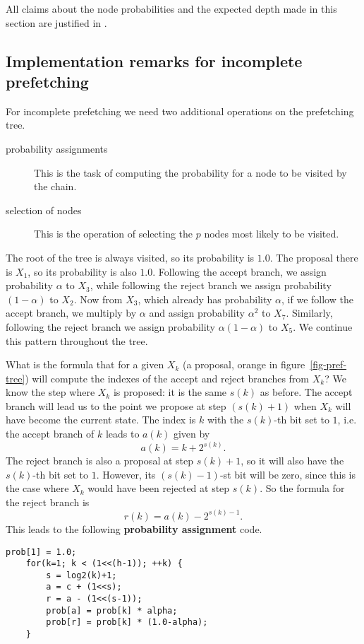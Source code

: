 \documentclass[11pt,letterpaper]{article}       %
\begin{document}
All claims about the node probabilities and the expected depth made in this 
section are justified in \cite{strid2010efficient}.

\subsection{Implementation remarks for incomplete prefetching}

For incomplete prefetching we need two additional operations on the prefetching 
tree.  
\begin{description}
\item[probability assignments] This is the task of computing the 
probability for a node to be visited by the chain.
\item[selection of nodes] This is the operation of selecting the 
$p$ nodes most likely to be visited.
\end{description}

The root of the tree is always visited, so its probability is $1.0$.  The 
proposal there is $X_1$, so its probability is also $1.0$.  Following the 
accept branch, we assign probability $\alpha$ to $X_3$, while following 
the reject branch we assign probability $(1-\alpha)$ to $X_2$.  Now from 
$X_3$, which already has probability $\alpha$, if we follow the 
accept branch, we multiply by $\alpha$ and assign probability $\alpha^2$ to 
$X_7$.  Similarly, following the reject branch we assign probability 
$\alpha(1-\alpha)$ to $X_5$. We continue this pattern throughout the tree. 

What is the formula that for a given $X_k$ (a proposal, orange in figure~\ref{fig-pref-tree})
will compute the indexes of the accept and reject branches from $X_k$? 
We know the step where $X_k$ is proposed: it is the same $s(k)$ as before.
The accept branch will lead us to the point we propose at step $(s(k)+1)$ when 
$X_k$ will have become the current state.  The index is $k$ with the $s(k)$-th bit set to $1$, i.e.
the accept branch of $k$ leads to $a(k)$ given by 
\begin{equation}
	a(k) = k + 2^{s(k)}.
\end{equation}
The reject branch is also a proposal at step $s(k)+1$, so it will also have the
$s(k)$-th bit set to $1$.  However, its $(s(k)-1)$-st bit will be zero, since
this is the case where $X_k$ would have been rejected at step $s(k)$.  So the
formula for the reject branch is 
\begin{equation}
	r(k) = a(k) - 2^{s(k)-1}.
\end{equation}
This leads to the following \textbf{probability assignment} code.
\begin{Verbatim}[frame=single]
    prob[1] = 1.0;
    for(k=1; k < (1<<(h-1)); ++k) {
        s = log2(k)+1;
        a = c + (1<<s);
        r = a - (1<<(s-1));
        prob[a] = prob[k] * alpha;
        prob[r] = prob[k] * (1.0-alpha);
    }
\end{Verbatim}
\end{document}
